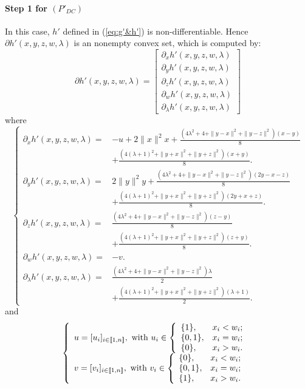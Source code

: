 \documentclass[3p]{elsarticle}
\newcommand{\IntEnt}[1]{\left[\!\left[#1\right]\!\right]}
\begin{document}
\paragraph{\textbf{Step 1 for $(P'_{DC})$}} In this case, $h'$ defined in (\ref{eq:g'&h'}) is non-differentiable. Hence $\partial h'(x,y,z,w,\lambda)$ is an nonempty convex set, which is computed by:
\begin{equation}\label{eq:dh'}
\partial h'(x,y,z,w,\lambda)  =\begin{bmatrix}
\partial_x h'(x,y,z,w,\lambda)\\
\partial_y h'(x,y,z,w,\lambda)\\
\partial_z h'(x,y,z,w,\lambda)\\
\partial_w h'(x,y,z,w,\lambda)\\
\partial_{\lambda} h'(x,y,z,w,\lambda)
\end{bmatrix}
\end{equation}
where
\begin{equation}
\left\lbrace 
\begin{array}{ll}
\partial_x h'(x,y,z,w,\lambda) = &-u+ 2\|x\|^2x + \frac{(4\lambda^2+4+\|y-x\|^2+\|y-z\|^2)(x-y)}{8} \\
&+ \frac{(4(\lambda+1)^2+\|y+x\|^2+\|y+z\|^2)(x+y)}{8}.\\
\partial_y h'(x,y,z,w,\lambda) = &2\|y\|^2y + \frac{(4\lambda^2+4+\|y-x\|^2+\|y-z\|^2)(2y-x-z)}{8} \\
&+ \frac{(4(\lambda+1)^2+\|y+x\|^2+\|y+z\|^2)(2y+x+z)}{8}.\\
\partial_z h'(x,y,z,w,\lambda) = & \frac{(4\lambda^2+4+\|y-x\|^2+\|y-z\|^2)(z-y)}{8} \\
&+ \frac{(4(\lambda+1)^2+\|y+x\|^2+\|y+z\|^2)(z+y)}{8}.\\
\partial_w h'(x,y,z,w,\lambda) = &-v.\\
\partial_{\lambda} h'(x,y,z,w,\lambda) = &\frac{(4\lambda^2+4+\|y-x\|^2+\|y-z\|^2)\lambda}{2} \\
&+ \frac{(4(\lambda+1)^2+\|y+x\|^2+\|y+z\|^2)(\lambda+1)}{2}.
\end{array}
\right. 
\end{equation}
and
\begin{equation}\label{eq:u&v}
\left\lbrace \begin{array}{l}
u=[u_i]_{i\in \IntEnt{1,n}}, \text{ with }u_i \in \left\{
\begin{array}{ll}
\{1\}, & \hbox{$x_i< w_i$;} \\
\{0,1\}, &  \hbox{$x_i=w_i$;}\\
\{0\}, & \hbox{$x_i> w_i$.}
\end{array}
\right.\\
v=[v_i]_{i\in \IntEnt{1,n}}, \text{ with } v_i \in \left\{
\begin{array}{ll}
\{0\}, & \hbox{$x_i< w_i$;} \\
\{0,1\}, &  \hbox{$x_i=w_i$;}\\
\{1\}, & \hbox{$x_i> w_i$.}
\end{array}
\right.
\end{array}
\right. 
\end{equation}
\end{document}
